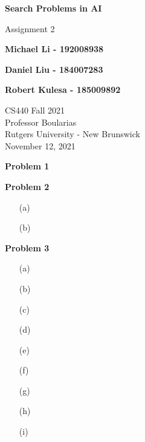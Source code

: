 \documentclass[11pt]{article}
\begin{document}
    \begin{titlepage}
        \begin{center}
            \vspace{1cm}

            \Huge
            \textbf{Search Problems in AI}

            \vspace{0.5cm}
            \LARGE
            Assignment 2

            \vspace{1cm}

            \textbf{Michael Li - 192008938}

            \textbf{Daniel Liu - 184007283}

            \textbf{Robert Kulesa - 185009892}


            \vfill


            \vspace{0.8cm}

            \Large
            CS440 Fall 2021\\
            Professor Boularias\\
            Rutgers University - New Brunswick\\
            November 12, 2021

        \end{center}
    \end{titlepage}

    \begin{center}
        \Large
        \textbf{Problem 1}
    \end{center}
    \normalsize

    \begin{center}
        \Large
        \textbf{Problem 2}
    \end{center}
    \normalsize
    \begin{enumerate}
        \item[(a)] %
        \item[(b)] %
    \end{enumerate}

    \begin{center}
        \Large
        \textbf{Problem 3}
    \end{center}
    \normalsize
    \begin{enumerate}
        \item[(a)] %
        \item[(b)] %
        \item[(c)] %
        \item[(d)] %
        \item[(e)] %
        \item[(f)] %
        \item[(g)] %
        \item[(h)] %
        \item[(i)] %
    \end{enumerate}
\end{document}
